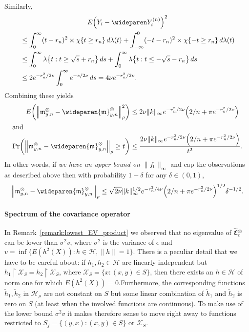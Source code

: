 \documentclass[10pt]{amsart}
\theoremstyle{definition}\newtheorem{defi}[theo]{Definition}\newtheorem{rema}[theo]{Remark}\newtheorem{exam}[theo]{Example}\newtheorem{exem}[theo]{Example}\newtheorem{nota}[theo]{Notation}
\theoremstyle{remark}
\newcommand{\restrr}
{\!\!\upharpoonright\!\!}
\newcommand{\X}{\mathcal{X}}
\newcommand{\cH}{\mathcal{H}}
\newcommand{\fkC}{\mathfrak{C}}
\newcommand{\mean}{\mathfrak{m}}
\let\oldtilde\tilde
\renewcommand*{\tilde}[1]{\mathchoice{\widetilde{#1}}{\widetilde{#1}}{\oldtilde{#1}}{\oldtilde{#1}}}
\let\originalleft\left
\let\originalright\right
\renewcommand{\left}{\mathopen{}\mathclose\bgroup\originalleft}
\renewcommand{\right}{\aftergroup\egroup\originalright}
\begin{document}
Similarly,
\begin{multline}\label{eq:cappedYVar}
E\left(Y_i - \wideparen Y^{(n)}_i\right)^2\\
\begin{aligned}
 &\leq \int_0^\infty (t-r_n)^2 \times \chi\{t \geq r_n \} \, d\lambda(t) + \int_{-\infty}^0 (-t-r_n)^2 \times \chi\{ - t \geq r_n \} \, d\lambda(t)  \\
&\leq \int_0^\infty \lambda\left\{ t : t \geq \sqrt{s} + r_n\right\} \, ds + \int_0^\infty \lambda\left\{t : t \leq - \sqrt{s} - r_n \right\} \, ds  \\
&\leq 2 e^{-r_n^2/2\nu} \int_{0}^\infty e^{-s/2\nu} \, ds = 4 \nu e^{-r_n^2/2 \nu}. 
\end{aligned}
\end{multline}
Combining these yields
\begin{align*}
E\left(\left\|\mean_{y,n}^{\otimes} - \wideparen{\mean}_{y,n}^\otimes \right\|^2_{\rho}\right) &\leq 2 \nu \|k\|_\infty e^{-r_n^2/2 \nu} \Bigl(2/n + \pi e^{-r_n^2/2 \nu} \Bigr)
\\
\intertext{and}
\Pr\left(\left\|\mean_{y,n}^{\otimes} - \wideparen{\mean}_{y,n}^\otimes \right\|_{\rho} \geq t\right) &\leq \frac{2 \nu \|k\|_\infty e^{-r_n^2/2 \nu} \Bigl(2/n + \pi e^{-r_n^2/2 \nu} \Bigr) }{t^2}.
\end{align*}
In other words, if \emph{we have an upper bound on $\|f_0\|_\infty$} and cap the observations as described above then with probability $1- \delta$ for any $\delta \in (0,1)$,
\begin{equation}\label{eq:mean_capped}
\left\|\mean_{y,n}^{\otimes} - \wideparen{\mean}_{y,n}^\otimes \right\|_{\rho} \leq \sqrt{2 \nu} \|k\|^{1/2}_\infty e^{-r_n^2/4 \nu} \Bigl(2/n + \pi e^{-r_n^2/2 \nu} \Bigr)^{1/2}
\delta^{-1/2}.
\end{equation}

\paragraph{Spectrum of the covariance operator} 
In Remark~\ref{remark:lowest_EV_product} we observed that no eigenvalue of $\tilde{\fkC}^{\otimes}_c$ can be lower than $\sigma^2v$, where $\sigma^2$ is the variance of $\epsilon$ and $v = \inf \{ E(h^2(X)) : h \in \cH, \|h \|=1\}$. There is a peculiar detail that we have to be careful about: if $h_1, h_2 \in \cH$ are linearly independent but $h_1\restrr \X_S = h_2\restrr \X_S$, where $\X_S = \{x : (x,y) \in S\}$, then there exists an $h \in \cH$ of norm one for which $E(h^2(X)) = 0$.\linebreak Furthermore, the corresponding functions $\check h_1, \check h_2$ in $\cH_\rho$ are not constant on $S$ but some linear combination of $\check h_1$ and $\check h_2$ is zero on $S$ (at least when the involved functions are continuous). To make use of the lower bound $\sigma^2 v$ it makes therefore sense to move right away to functions restricted to $S_f = \{(y,x) : (x,y) \in S\}$ or $\X_S$.
\end{document}

